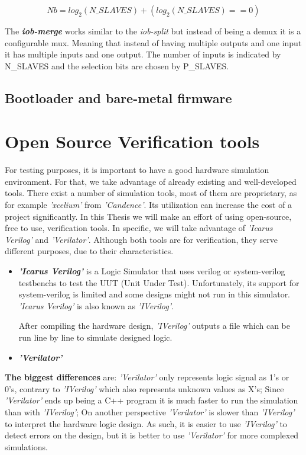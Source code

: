 \begin{equation}
    \label{eq:number_bits}
    Nb = log_2(N\_SLAVES)+(log_2(N\_SLAVES)==0)
\end{equation}

The \textbf{\textit{iob-merge}} works similar to the \textit{iob-split} but instead of being a \acrshort{demux} it is a configurable \acrfull{mux}. Meaning that instead of having multiple outputs and one input it has multiple inputs and one output. The number of inputs is indicated by N\_SLAVES and the selection bits are chosen by P\_SLAVES.

\subsection{Bootloader and bare-metal firmware}

\section{Open Source Verification tools}
For testing purposes, it is important to have a good hardware simulation environment. For that, we take advantage of already existing and well-developed tools. There exist a number of simulation tools, most of them are proprietary, as for example \textit{'xcelium'} from \textit{'Candence'}. Its utilization can increase the cost of a project significantly. In this Thesis we will make an effort of using open-source, free to use, verification tools. In specific, we will take advantage of \textit{'Icarus Verilog'} and \textit{'Verilator'}. Although both tools are for verification, they serve different purposes, due to their characteristics.

\begin{itemize}
    \item \textbf{\textit{'Icarus Verilog'}} is a Logic Simulator that uses verilog or system-verilog testbenchs to test the UUT (Unit Under Test). Unfortunately, its support for system-verilog is limited and some designs might not run in this simulator. \textit{'Icarus Verilog'} is also known as \textit{'IVerilog'}.
    
    After compiling the hardware design, \textit{'IVerilog'} outputs a file which can be run line by line to simulate designed logic.
    
    \item \textbf{\textit{'Verilator'}}
\end{itemize}

\textbf{The biggest differences} are: \textit{'Verilator'} only represents logic signal as 1's or 0's, contrary to \textit{'IVerilog'} which also represents unknown values as X's; Since \textit{'Verilator'} ends up being a C++ program it is much faster to run the simulation than with \textit{'IVerilog'}; On another perspective \textit{'Verilator'} is slower than \textit{'IVerilog'} to interpret the hardware logic design.
As such, it is easier to use \textit{'IVerilog'} to detect errors on the design, but it is better to use \textit{'Verilator'} for more complexed simulations.

